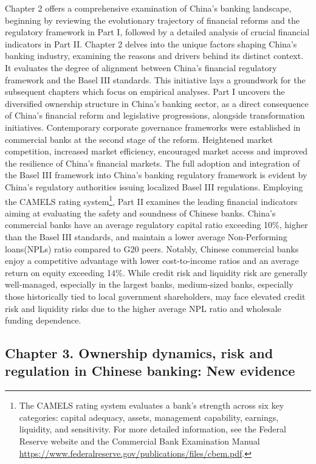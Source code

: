 \documentclass[
  12pt,
  a4paper,
]{scrreprt}
\begin{document}
Chapter 2 offers a comprehensive examination of China's banking
landscape, beginning by reviewing the evolutionary trajectory of
financial reforms and the regulatory framework in Part I, followed by a
detailed analysis of crucial financial indicators in Part II. Chapter 2
delves into the unique factors shaping China's banking industry,
examining the reasons and drivers behind its distinct context. It
evaluates the degree of alignment between China's financial regulatory
framework and the Basel III standards. This initiative lays a groundwork
for the subsequent chapters which focus on empirical analyses. Part I
uncovers the diversified ownership structure in China's banking sector,
as a direct consequence of China's financial reform and legislative
progressions, alongside transformation initiatives. Contemporary
corporate governance frameworks were established in commercial banks at
the second stage of the reform. Heightened market competition, increased
market efficiency, encouraged market access and improved the resilience
of China's financial markets. The full adoption and integration of the
Basel III framework into China's banking regulatory framework is evident
by China's regulatory authorities issuing localized Basel III
regulations. Employing the CAMELS rating system\footnote{The CAMELS
  rating system evaluates a bank's strength across six key categories:
  capital adequacy, assets, management capability, earnings, liquidity,
  and sensitivity. For more detailed information, see the Federal
  Reserve website and the Commercial Bank Examination Manual
  \url{https://www.federalreserve.gov/publications/files/cbem.pdf}.},
Part II examines the leading financial indicators aiming at evaluating
the safety and soundness of Chinese banks. China's commercial banks have
an average regulatory capital ratio exceeding 10\%, higher than the
Basel III standards, and maintain a lower average Non-Performing
loans(NPLs) ratio compared to G20 peers. Notably, Chinese commercial
banks enjoy a competitive advantage with lower cost-to-income ratios and
an average return on equity exceeding 14\%. While credit risk and
liquidity risk are generally well-managed, especially in the largest
banks, medium-sized banks, especially those historically tied to local
government shareholders, may face elevated credit risk and liquidity
risks due to the higher average NPL ratio and wholesale funding
dependence.

\subsection{Chapter 3. Ownership dynamics, risk and regulation in
Chinese banking: New
evidence}\label{chapter-3.-ownership-dynamics-risk-and-regulation-in-chinese-banking-new-evidence}
\end{document}
